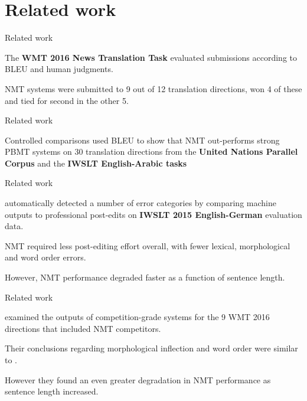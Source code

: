 \documentclass{beamer}
\begin{document}
\section{Related work}

\begin{frame}{Related work}

  The \textbf{WMT 2016 News Translation Task} \parencite{bojar-etal-2016-findings} evaluated submissions according to BLEU and human judgments.

  NMT systems were submitted to 9 out of 12 translation directions, won 4 of these and tied for second in the other 5.

\end{frame}

\begin{frame}{Related work}

  Controlled comparisons used BLEU to show that NMT out-performs strong PBMT systems on 30 translation directions from the \textbf{United Nations Parallel Corpus} \parencite{junczys2016neural} and the \textbf{IWSLT English-Arabic tasks} \parencite{durrani2017qcri} 

\end{frame}

\begin{frame}{Related work}

  \textcite{bentivogli2016neural} automatically detected a number of error categories by comparing machine outputs to professional post-edits on \textbf{IWSLT 2015 English-German} evaluation data.

  \medskip

  NMT required less post-editing effort overall, with fewer lexical, morphological and word order errors.

  \medskip

  However, NMT performance degraded faster as a function of sentence length.

\end{frame}

\begin{frame}{Related work}

  \textcite{toral2017multifaceted} examined the outputs of competition-grade systems for the 9 WMT 2016 directions that included NMT competitors.

  \medskip

  Their conclusions regarding morphological inflection and word order were similar to \textcite{bentivogli2016neural}.

  \medskip

  However they found an even greater degradation in NMT performance as sentence length increased.

\end{frame}
\end{document}
